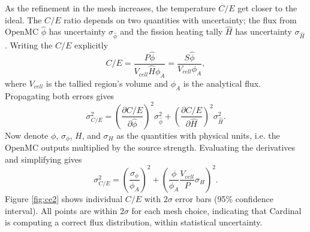 \documentclass[letterpaper]{mc2023}
\begin{document}
As the refinement in the mesh increases, the temperature $C/E$ get closer to the ideal. The $C/E$ ratio depends on two quantities with uncertainty; the
flux from OpenMC $\hat{\phi}$ has uncertainty $\sigma_{\hat{\phi}}$ and the fission heating tally $\hat{H}$ has uncertainty $\sigma_{\hat{H}}$. Writing
the $C/E$ explicitly
\begin{equation}\label{eq:CE_formula}
    C/E = 
    \frac{P\hat{\phi}}{V_{cell}\hat{H}\phi_{A}} = \frac{S\hat{\phi}}{V_{cell}\phi_{A}},
\end{equation}
where $V_{cell}$ is the tallied region's volume and $\phi_{A}$ is the analytical flux. Propagating both errors gives
\begin{equation}\label{eq:sigma_ce_def}
    \sigma_{C/E}^2 =
    \left( \frac{\partial C/E}{\partial\hat{\phi}} \right)^2 \sigma_{\hat{\phi}}^2  +
     \left( \frac{\partial C/E}{\partial \hat{H}} \right)^2 \sigma_{\hat{H}}^2 .
\end{equation}
Now denote $\phi$, $\sigma_{\phi}$, $H$, and $\sigma_{H}$ as the quantities with physical units, i.e. the OpenMC outputs multiplied by the source strength.
Evaluating the derivatives and simplifying gives
\begin{equation}\label{eq:sigma_CE_physical_units}
    \sigma_{C/E}^2 =
    \left(\frac{\sigma_{\phi} }{\phi_{A}} \right)^2 +
     \left( \frac{\phi}{\phi_{A}}\frac{V_{cell}}{P}\sigma_{H} \right)^2.
\end{equation}
Figure \ref{fig:ce2} shows individual $C/E$ with $2\sigma$ error bars (95\% confidence interval). All points are within $2\sigma$ for each mesh choice, indicating that Cardinal is computing
a correct flux distribution, within statistical uncertainty. 
\end{document}
